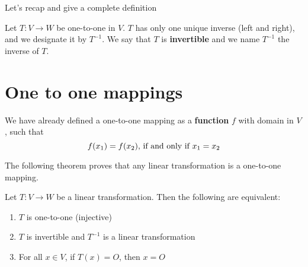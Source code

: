 \documentclass[../linear-spaces.tex]{subfiles}
\begin{document}
Let's recap and give a complete definition

\begin{definition}
    Let $T:V \to W$ be one-to-one in $V$. $T$ has only one unique inverse (left and right), and
    we designate it by $T^{-1}$. We say that $T$ is \textbf{invertible} and we name $T^{-1}$ the
    inverse of $T$.
\end{definition}

\section{One to one mappings}

We have already defined a one-to-one mapping as a \textbf{function} $f$ with
domain in $V$, such that
\begin{equation*}
    f(x_1) = f(x_2), \, \textnormal{if and only if } x_1 = x_2
\end{equation*}

The following theorem proves that any linear transformation is a one-to-one
mapping.
\begin{theorem}
    Let $T: V \to W$ be a linear transformation. Then the following are equivalent:
    \begin{enumerate}
        \item $T$ is one-to-one (injective)
        \item $T$ is invertible and $T^{-1}$ is a linear transformation
        \item For all $x \in V$, if $T(x) = O$, then $x = O$
    \end{enumerate}
\end{theorem}

\end{document}
